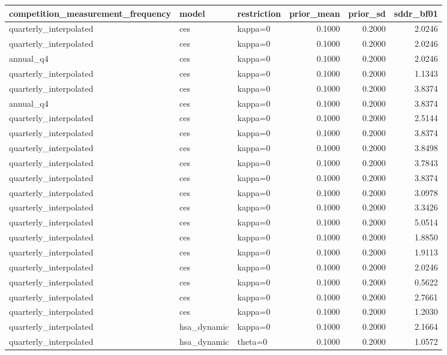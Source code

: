\begin{tabular}{lllrrr}
\toprule
competition\_measurement\_frequency & model & restriction & prior\_mean & prior\_sd & sddr\_bf01 \\
\midrule
quarterly\_interpolated & ces & kappa=0 & 0.1000 & 0.2000 & 2.0246 \\
quarterly\_interpolated & ces & kappa=0 & 0.1000 & 0.2000 & 2.0246 \\
annual\_q4 & ces & kappa=0 & 0.1000 & 0.2000 & 2.0246 \\
quarterly\_interpolated & ces & kappa=0 & 0.1000 & 0.2000 & 1.1343 \\
quarterly\_interpolated & ces & kappa=0 & 0.1000 & 0.2000 & 3.8374 \\
annual\_q4 & ces & kappa=0 & 0.1000 & 0.2000 & 3.8374 \\
quarterly\_interpolated & ces & kappa=0 & 0.1000 & 0.2000 & 2.5144 \\
quarterly\_interpolated & ces & kappa=0 & 0.1000 & 0.2000 & 3.8374 \\
quarterly\_interpolated & ces & kappa=0 & 0.1000 & 0.2000 & 3.8498 \\
quarterly\_interpolated & ces & kappa=0 & 0.1000 & 0.2000 & 3.7843 \\
quarterly\_interpolated & ces & kappa=0 & 0.1000 & 0.2000 & 3.8374 \\
quarterly\_interpolated & ces & kappa=0 & 0.1000 & 0.2000 & 3.0978 \\
quarterly\_interpolated & ces & kappa=0 & 0.1000 & 0.2000 & 3.3426 \\
quarterly\_interpolated & ces & kappa=0 & 0.1000 & 0.2000 & 5.0514 \\
quarterly\_interpolated & ces & kappa=0 & 0.1000 & 0.2000 & 1.8850 \\
quarterly\_interpolated & ces & kappa=0 & 0.1000 & 0.2000 & 1.9113 \\
quarterly\_interpolated & ces & kappa=0 & 0.1000 & 0.2000 & 2.0246 \\
quarterly\_interpolated & ces & kappa=0 & 0.1000 & 0.2000 & 0.5622 \\
quarterly\_interpolated & ces & kappa=0 & 0.1000 & 0.2000 & 2.7661 \\
quarterly\_interpolated & ces & kappa=0 & 0.1000 & 0.2000 & 1.2030 \\
quarterly\_interpolated & hsa\_dynamic & kappa=0 & 0.1000 & 0.2000 & 2.1664 \\
quarterly\_interpolated & hsa\_dynamic & theta=0 & 0.1000 & 0.2000 & 1.0572 \\

\end{tabular}
